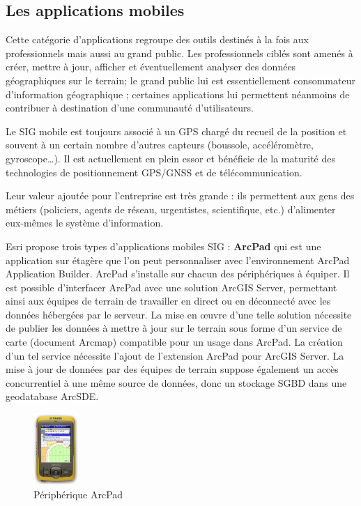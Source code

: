 \documentclass[11pt]{article}
\begin{document}
\subsection{Les applications mobiles}
Cette catégorie d'applications regroupe des outils destinés à la fois aux professionnels mais aussi au grand public. Les professionnels ciblés sont amenés à  créer, mettre à jour, afficher et éventuellement analyser des données géographiques sur le terrain; le grand public lui est essentiellement consommateur d'information géographique ; certaines applications lui permettent néanmoins de contribuer à destination d'une communauté d'utilisateurs.

Le SIG mobile est toujours associé à un GPS chargé du recueil de la position et souvent à un certain nombre d'autres capteurs (boussole, accéléromètre, gyroscope…). Il est actuellement en plein essor et bénéficie de la maturité des technologies de positionnement GPS/GNSS et de télécommunication.

Leur valeur ajoutée pour l'entreprise est très grande : ils permettent aux gens des métiers (policiers, agents de réseau, urgentistes, scientifique, etc.) d'alimenter eux-mêmes le système d'information.

Esri propose trois types d'applications mobiles SIG : 
\textbf{ArcPad} qui est une application sur étagère que l'on peut personnaliser avec l'environnement ArcPad Application Builder. ArcPad s'installe sur chacun des périphériques à équiper. Il est possible d'interfacer ArcPad avec une solution ArcGIS Server, permettant ainsi aux équipes de terrain de travailler en direct ou en déconnecté avec les données hébergées par le serveur. La mise en œuvre d'une telle solution nécessite de publier les données à mettre à jour sur le terrain sous forme d'un service de carte (document Arcmap) compatible pour un usage dans ArcPad. La création d'un tel service nécessite l'ajout de l'extension ArcPad pour ArcGIS Server. La mise à jour de données par des équipes de terrain suppose également un accès concurrentiel à une même source de données, donc un stockage SGBD dans une geodatabase ArcSDE.
\begin{figure}[H]
	\center \includegraphics[width=0.15\textwidth]{img/cours/arcpad.jpg}
	\caption{Périphérique ArcPad}
\end{figure}
	
\end{document}

